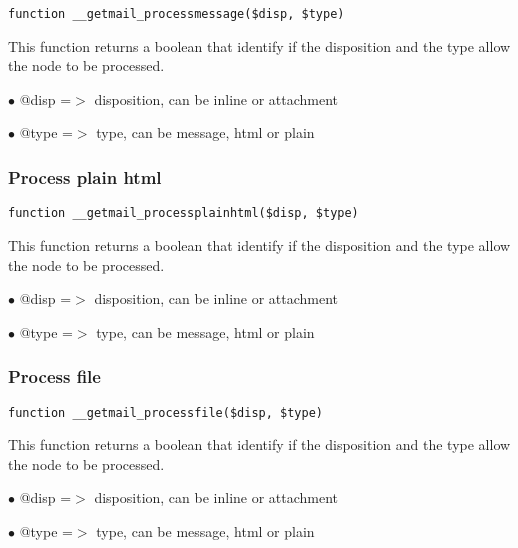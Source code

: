 \documentclass[a4paper]{article}
\begin{document}
\begin{lstlisting}
function __getmail_processmessage($disp, $type)
\end{lstlisting}

This function returns a boolean that identify if the disposition and the type
allow the node to be processed.

\begin{compactitem}
\item[\color{myblue}$\bullet$] @disp =$>$ disposition, can be inline or attachment
\item[\color{myblue}$\bullet$] @type =$>$ type, can be message, html or plain
\end{compactitem}

\hypertarget{toc73}{}
\subsubsection{Process plain html}

\begin{lstlisting}
function __getmail_processplainhtml($disp, $type)
\end{lstlisting}

This function returns a boolean that identify if the disposition and the type
allow the node to be processed.

\begin{compactitem}
\item[\color{myblue}$\bullet$] @disp =$>$ disposition, can be inline or attachment
\item[\color{myblue}$\bullet$] @type =$>$ type, can be message, html or plain
\end{compactitem}

\hypertarget{toc74}{}
\subsubsection{Process file}

\begin{lstlisting}
function __getmail_processfile($disp, $type)
\end{lstlisting}

This function returns a boolean that identify if the disposition and the type
allow the node to be processed.

\begin{compactitem}
\item[\color{myblue}$\bullet$] @disp =$>$ disposition, can be inline or attachment
\item[\color{myblue}$\bullet$] @type =$>$ type, can be message, html or plain
\end{compactitem}
\end{document}
